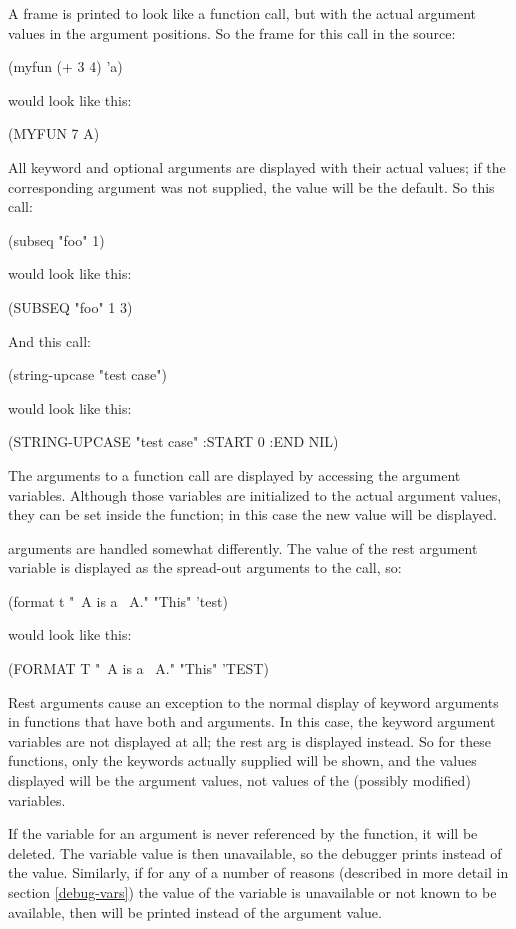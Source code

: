 A frame is printed to look like a function call, but with the actual argument
values in the argument positions.  So the frame for this call in the source:
\begin{lisp}
(myfun (+ 3 4) 'a)
\end{lisp}
would look like this:
\begin{example}
(MYFUN 7 A)
\end{example}
All keyword and optional arguments are displayed with their actual
values; if the corresponding argument was not supplied, the value will
be the default.  So this call:
\begin{lisp}
(subseq "foo" 1)
\end{lisp}
would look like this:
\begin{example}
(SUBSEQ "foo" 1 3)
\end{example}
And this call:
\begin{lisp}
(string-upcase "test case")
\end{lisp}
would look like this:
\begin{example}
(STRING-UPCASE "test case" :START 0 :END NIL)
\end{example}

The arguments to a function call are displayed by accessing the argument
variables.  Although those variables are initialized to the actual argument
values, they can be set inside the function; in this case the new value will be
displayed.

 arguments are handled somewhat differently.  The value of
the rest argument variable is displayed as the spread-out arguments to
the call, so:
\begin{lisp}
(format t "~A is a ~A." "This" 'test)
\end{lisp}
would look like this:
\begin{example}
(FORMAT T "~A is a ~A." "This" 'TEST)
\end{example}
Rest arguments cause an exception to the normal display of keyword
arguments in functions that have both  and 
arguments.  In this case, the keyword argument variables are not
displayed at all; the rest arg is displayed instead.  So for these
functions, only the keywords actually supplied will be shown, and the
values displayed will be the argument values, not values of the
(possibly modified) variables.

If the variable for an argument is never referenced by the function, it will be
deleted.  The variable value is then unavailable, so the debugger prints
 instead of the value.  Similarly, if for any of a number of
reasons (described in more detail in section \ref{debug-vars}) the value of the
variable is unavailable or not known to be available, then
 will be printed instead of the argument value.

